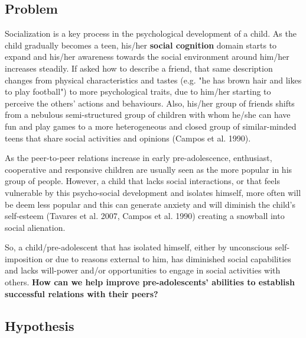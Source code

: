 \documentclass[runningheads]{llncs}
\begin{document}
\subsection{Problem}
Socialization is a key process in the psychological development of a child. As the child gradually becomes a teen, his/her \textbf{social cognition} domain starts to expand and his/her awareness towards the social environment around him/her increases steadily. If asked how to describe a friend, that same description changes from physical characteristics and tastes (e.g. "he has brown hair and likes to play football") to more psychological traits, due to him/her starting to perceive the others' actions and behaviours. Also, his/her group of friends shifts from a nebulous semi-structured group of children with whom he/she can have fun and play games to a more heterogeneous and closed group of similar-minded teens that share social activities and opinions (Campos et al. 1990). 
\par As the peer-to-peer relations increase in early pre-adolescence, enthusiast, cooperative and responsive children are usually seen as the more popular in his group of people. However, a child that lacks social interactions, or that feels vulnerable by this psycho-social development and isolates himself, more often will be deem less popular and this can generate anxiety and will diminish the child's self-esteem (Tavares et al. 2007, Campos et al. 1990) creating a snowball into social alienation.
\par So, a child/pre-adolescent that has isolated himself, either by unconscious self-imposition or due to reasons external to him, has diminished social capabilities and lacks will-power and/or opportunities to engage in social activities with others.  \textbf{How can we help improve pre-adolescents' abilities to establish successful relations with their peers?}


\subsection{Hypothesis}

\end{document}
